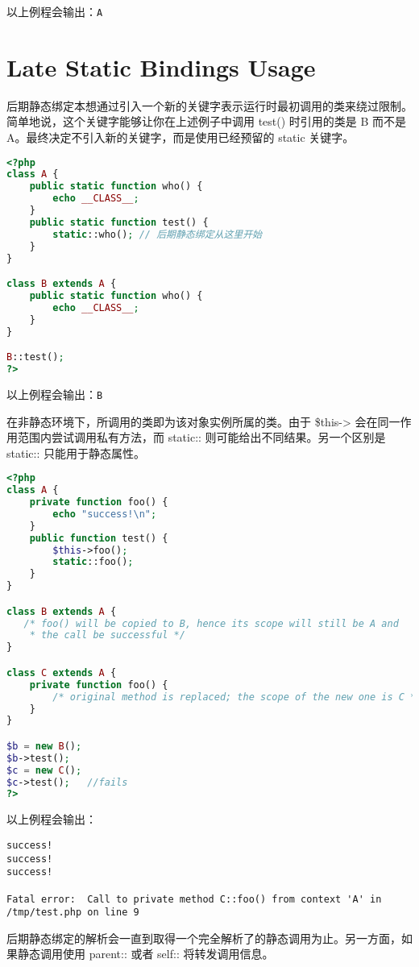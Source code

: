 以上例程会输出：\verb|A|



\section{Late Static Bindings Usage}


后期静态绑定本想通过引入一个新的关键字表示运行时最初调用的类来绕过限制。简单地说，这个关键字能够让你在上述例子中调用 test() 时引用的类是 B 而不是 A。最终决定不引入新的关键字，而是使用已经预留的 static 关键字。

\begin{lstlisting}[language=PHP]
<?php
class A {
    public static function who() {
        echo __CLASS__;
    }
    public static function test() {
        static::who(); // 后期静态绑定从这里开始
    }
}

class B extends A {
    public static function who() {
        echo __CLASS__;
    }
}

B::test();
?>
\end{lstlisting}


以上例程会输出：\verb|B|

在非静态环境下，所调用的类即为该对象实例所属的类。由于 \$this-> 会在同一作用范围内尝试调用私有方法，而 static:: 则可能给出不同结果。另一个区别是 static:: 只能用于静态属性。

\begin{lstlisting}[language=PHP]
<?php
class A {
    private function foo() {
        echo "success!\n";
    }
    public function test() {
        $this->foo();
        static::foo();
    }
}

class B extends A {
   /* foo() will be copied to B, hence its scope will still be A and
    * the call be successful */
}

class C extends A {
    private function foo() {
        /* original method is replaced; the scope of the new one is C */
    }
}

$b = new B();
$b->test();
$c = new C();
$c->test();   //fails
?>
\end{lstlisting}

以上例程会输出：

\begin{verbatim}
success!
success!
success!

Fatal error:  Call to private method C::foo() from context 'A' in /tmp/test.php on line 9
\end{verbatim}


后期静态绑定的解析会一直到取得一个完全解析了的静态调用为止。另一方面，如果静态调用使用 parent:: 或者 self:: 将转发调用信息。




